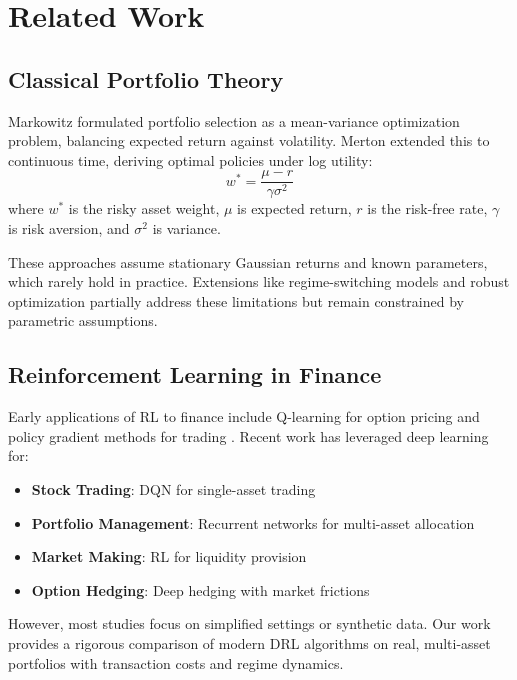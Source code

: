 \documentclass[12pt]{article}
\begin{document}
\section{Related Work}

\subsection{Classical Portfolio Theory}

Markowitz \citep{markowitz1952} formulated portfolio selection as a mean-variance optimization problem, balancing expected return against volatility. Merton \citep{merton1969, merton1971} extended this to continuous time, deriving optimal policies under log utility:
\begin{equation}
    w^* = \frac{\mu - r}{\gamma \sigma^2}
\end{equation}
where $w^*$ is the risky asset weight, $\mu$ is expected return, $r$ is the risk-free rate, $\gamma$ is risk aversion, and $\sigma^2$ is variance.

These approaches assume stationary Gaussian returns and known parameters, which rarely hold in practice. Extensions like regime-switching models \citep{hamilton1989} and robust optimization \citep{fabozzi2007} partially address these limitations but remain constrained by parametric assumptions.

\subsection{Reinforcement Learning in Finance}

Early applications of RL to finance include Q-learning for option pricing \citep{neuneier1996} and policy gradient methods for trading \citep{moody1998}. Recent work has leveraged deep learning for:

\begin{itemize}
    \item \textbf{Stock Trading}: DQN for single-asset trading \citep{deng2017}
    \item \textbf{Portfolio Management}: Recurrent networks for multi-asset allocation \citep{jiang2017}
    \item \textbf{Market Making}: RL for liquidity provision \citep{spooner2018}
    \item \textbf{Option Hedging}: Deep hedging with market frictions \citep{buehler2019}
\end{itemize}

However, most studies focus on simplified settings or synthetic data. Our work provides a rigorous comparison of modern DRL algorithms on real, multi-asset portfolios with transaction costs and regime dynamics.
\end{document}
